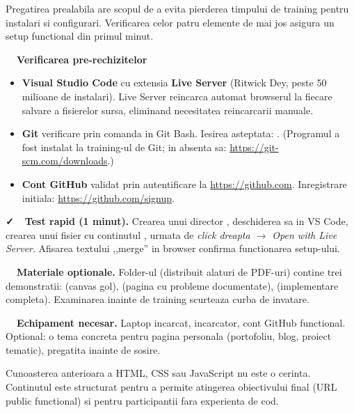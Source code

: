 \documentclass[11pt,a4paper]{article}
\begin{document}

Pregatirea prealabila are scopul de a evita pierderea timpului de training pentru instalari si configurari. Verificarea celor patru elemente de mai jos asigura un setup functional din primul minut.

\bigskip

\textbf{\faLaptopCode\ \ Verificarea pre-rechizitelor}

\begin{itemize}[leftmargin=*, itemsep=4pt]
  \item \textbf{Visual Studio Code} cu extensia \textbf{Live Server} (Ritwick Dey, peste 50 milioane de instalari). Live Server reincarca automat browserul la fiecare salvare a fisierelor sursa, eliminand necesitatea reincarcarii manuale.
  \item \textbf{Git} \textendash{} verificare prin comanda  in Git Bash. Iesirea asteptata: . (Programul a fost instalat la training-ul de Git; in absenta sa: \url{https://git-scm.com/downloads}.)
  \item \textbf{Cont GitHub} \textendash{} validat prin autentificare la \url{https://github.com}. Inregistrare initiala: \url{https://github.com/signup}.
\end{itemize}

\bigskip

\textbf{\faCheck\ \ Test rapid (1 minut).} Crearea unui director , deschiderea sa in VS Code, crearea unui fisier  cu continutul , urmata de \emph{click dreapta $\to$ Open with Live Server}. Afisarea textului ,,merge'' in browser confirma functionarea setup-ului.

\bigskip

\textbf{\faMagic\ \ Materiale optionale.} Folder-ul  (distribuit alaturi de PDF-uri) contine trei demonstratii:  (canvas gol),  (pagina cu probleme documentate),  (implementare completa). Examinarea  inainte de training scurteaza curba de invatare.

\bigskip

\textbf{\faRocket\ \ Echipament necesar.} Laptop incarcat, incarcator, cont GitHub functional. Optional: o tema concreta pentru pagina personala (portofoliu, blog, proiect tematic), pregatita inainte de sosire.

\begin{nota}
Cunoasterea anterioara a HTML, CSS sau JavaScript nu este o cerinta. Continutul este structurat pentru a permite atingerea obiectivului final (URL public functional) si pentru participantii fara experienta de cod.
\end{nota}
\end{document}
